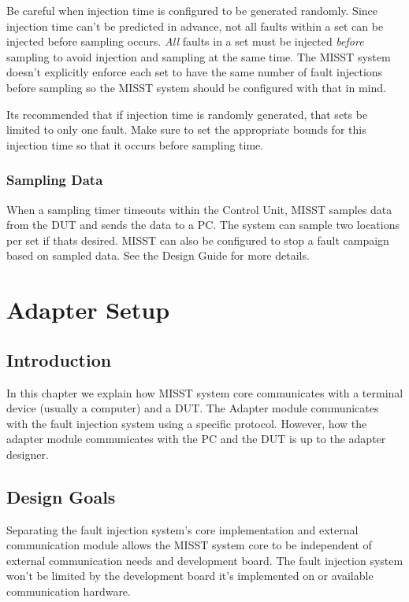 \documentclass[]{report}
\begin{document}
Be careful when injection time is configured to be generated randomly. Since injection time can't be predicted in advance, not all faults within a set can be injected before sampling occurs. \textit{All} faults in a set must be injected \textit{before} sampling to avoid injection and sampling at the same time. The MISST system doesn't explicitly enforce each set to have the same number of fault injections before sampling so the MISST system should be configured with that in mind. 

Its recommended that if injection time is randomly generated, that sets be limited to only one fault. Make sure to set the appropriate bounds for this injection time so that it occurs before sampling time.

\subsection{Sampling Data}
\label{s sampling data}

When a sampling timer timeouts within the Control Unit, MISST samples data from the DUT and sends the data to a PC. The system can sample two locations per set if thats desired. MISST can also be configured to stop a fault campaign based on sampled data. See the Design Guide for more details.

\chapter{Adapter Setup}
\label{c adapter setup}

\section{Introduction}
In this chapter we explain how MISST system core communicates with a terminal device (usually a computer) and a DUT. The Adapter module communicates with the fault injection system using a specific protocol. However, how the adapter module communicates with the PC and the DUT is up to the adapter designer.

\section{Design Goals}
Separating the fault injection system's core implementation and external communication module allows the MISST system core to be independent of external communication needs and development board. The fault injection system won't be limited by the development board it's implemented on or available communication hardware. 
\end{document}
